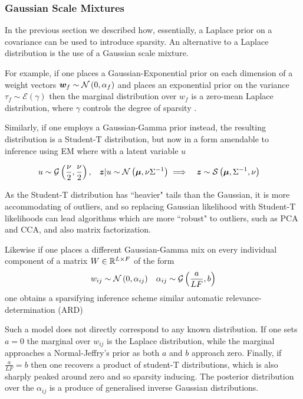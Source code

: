 

\subsubsection{Gaussian Scale Mixtures}
In the previous section we described how, essentially, a Laplace prior on a covariance can be used to introduce sparsity. An alternative to a Laplace distribution is the use of a Gaussian scale mixture.

For example, if one places a Gaussian-Exponential prior on each dimension of a weight vectors $\bm w_f \sim \mathcal{N} \left( {0}, {\alpha_f} \right)$ and places an exponential prior on the variance $\tau_f \sim \mathcal{E}\left(\gamma\right)$ then the marginal distribution over $w_f$ is a zero-mean Laplace distribution, where $\gamma$ controls the degree of sparsity \cite{Figueiredo2003}.

Similarly, if one employs a Gaussian-Gamma prior instead, the resulting distribution is a Student-T distribution, but now in a form amendable to inference using EM where with a latent variable $u$

\begin{align}
u & \sim \mathcal{G}\left(\frac{\nu}{2}, \frac{\nu}{2} \right) ,
& \bm z|u \sim \mathcal{N} \left( {\bm \mu}, {\nu {\Sigma}^{-1}} \right) 
& \implies & \bm z & \sim \mathcal{S}\left(\bm \mu, {\Sigma}^{-1}, \nu \right)
\end{align}

As the Student-T distribution has ``heavier" tails than the Gaussian, it is more accommodating of outliers, and so replacing Gaussian likelihood with Student-T likelihoods can lead algorithms which are more ``robust" to outliers, such as PCA and CCA\cite{Archambeau2006a}, and also matrix factorization\cite{Balaji2011}.

Likewise if one places a different Gaussian-Gamma mix on every individual component of a matrix $W \in { \mathbb{R}^{L \times F} }$ of the form
\begin{align}
w_{ij} &\sim \mathcal{N} \left( {0}, {\alpha_{ij}} \right) & \alpha_{ij} \sim \mathcal{G}\left(\frac{a}{LF}, b\right)
\end{align}
one obtains a sparsifying inference scheme\cite{Archambeau2009a} similar automatic relevance-determination (ARD)

Such a model does not directly correspond to any known distribution. If one sets $a=0$ the marginal over $w_{ij}$ is the Laplace distribution, while the marginal approaches a Normal-Jeffry's prior as both $a$ and $b$ approach zero. Finally, if $\frac{a}{LF} = b$ then one recovers a product of student-T distributions, which is also sharply peaked around zero and so sparsity inducing. The posterior distribution over the $\alpha_{ij}$ is a produce of generalised inverse Gaussian distributions.

